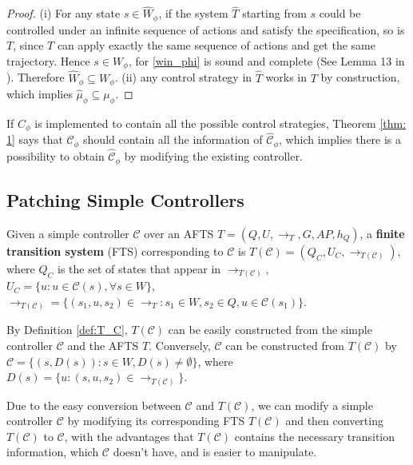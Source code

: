 \begin{proof}
	(i) For any state $ s\in \widehat{W}_{\phi} $, if the system $ \widehat{T} $ starting from $ s $ could be controlled under an infinite sequence of actions and satisfy the specification, so is $ T $, since $ T $ can apply exactly the same sequence of actions and get the same trajectory. Hence $ s\in W_{\phi} $, for \eqref{win_phi} is sound and complete (See Lemma 13 in \cite{Nilsson2017}). Therefore $ \widehat{W}_{\phi}\subseteq W_{\phi} $. (ii) any control strategy in $ \widehat{T} $ works in $ T $ by construction, which implies $ \widehat{\mu}_{\phi} \subseteq \mu_{\phi}$.
\end{proof}

If $ C_{\phi} $ is implemented to contain all the possible control strategies, Theorem \ref{thm: 1} says that $ \mathcal{C}_{\phi} $ should contain all the information of $ \widehat{\mathcal{C}}_{\phi} $, which implies there is a possibility to obtain $ \widehat{\mathcal{C}}_{\phi} $ by modifying the existing controller.



\subsection{Patching Simple Controllers}
\label{sec:patching_simple}
\begin{definition}
	Given a simple controller $ \mathcal{C} $ over an AFTS $T = (Q,U,\rightarrow_T, G,AP,h_Q) $, a \textbf{finite transition system} (FTS) corresponding to $ \mathcal{C} $ is $T(\mathcal{C}) = (Q_C, U_C, \rightarrow_{T(\mathcal{C})})$, where $ Q_C $ is the set of states that appear in $ \rightarrow_{T(\mathcal{C})} $, $ U_C=\{u: u\in \mathcal{C}(s), \forall s\in W\} $, $ \rightarrow_{T(\mathcal{C})} =\{(s_1,u,s_2)\in \rightarrow_T: s_1\in W,s_2\in Q, u\in \mathcal{C}(s_1)\} $. \label{def:T_C}
\end{definition}

\begin{remark}
	By Definition \ref{def:T_C}, $ T(\mathcal{C}) $ can be easily constructed from the simple controller $ \mathcal{C} $ and the AFTS $ T $. Conversely, $ \mathcal{C} $ can be constructed from $ T(\mathcal{C}) $ by $ \mathcal{C} = \{(s,D(s)):s\in W,D(s)\not=\emptyset\} $, where $ D(s)=\{u:(s,u,s_2)\in \rightarrow_{T(\mathcal{C})}\} $.
\end{remark}
Due to the easy conversion between  $ \mathcal{C} $ and $ T(\mathcal{C}) $, we can modify a simple controller $ \mathcal{C} $ by modifying its corresponding FTS $ T(\mathcal{C}) $ and then converting $ T(\mathcal{C}) $ to $ \mathcal{C} $, with the advantages that $ T(\mathcal{C}) $ contains the necessary transition information, which $ \mathcal{C} $ doesn't have, and is easier to manipulate. 

